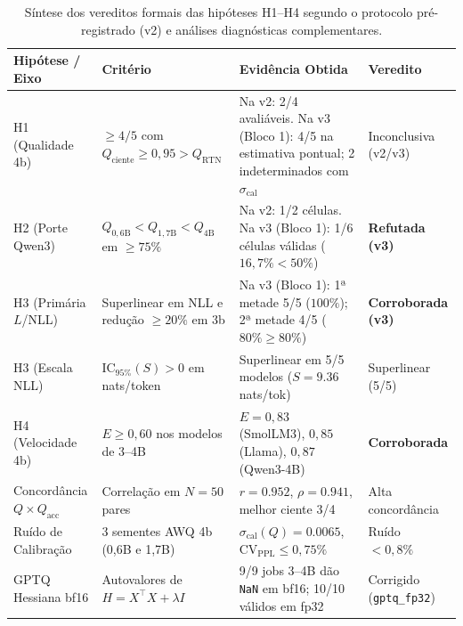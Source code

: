 \begin{table}[htbp]
\centering
\caption{Síntese dos vereditos formais das hipóteses H1--H4 segundo o protocolo pré-registrado (v2) e análises diagnósticas complementares.}
\label{tab:vereditos_hipoteses}
\footnotesize
\begin{tabular}{p{2.8cm}p{4.2cm}p{5.2cm}p{2.2cm}}
\toprule
Hipótese / Eixo & Critério & Evidência Obtida & Veredito \\
\midrule
H1 (Qualidade 4b) & $\ge 4/5$ com $Q_{\text{ciente}} \ge 0{,}95 > Q_{\text{RTN}}$ & Na v2: 2/4 avaliáveis. Na v3 (Bloco 1): 4/5 na estimativa pontual; 2 indeterminados com $\sigma_{\text{cal}}$ & Inconclusiva (v2/v3) \\
H2 (Porte Qwen3) & $Q_{0{,}6\text{B}} < Q_{1{,}7\text{B}} < Q_{4\text{B}}$ em $\ge 75\%$ & Na v2: 1/2 células. Na v3 (Bloco 1): 1/6 células válidas ($16{,}7\% < 50\%$) & \textbf{Refutada (v3)} \\
H3 (Primária $L$/NLL) & Superlinear em NLL e redução $\ge 20\%$ em 3b & Na v3 (Bloco 1): 1ª metade 5/5 ($100\%$); 2ª metade 4/5 ($80\% \ge 80\%$) & \textbf{Corroborada (v3)} \\
H3 (Escala NLL) & $\text{IC}_{95\%}(S) > 0$ em nats/token & Superlinear em 5/5 modelos ($S = 9.36$ nats/tok) & Superlinear (5/5) \\
H4 (Velocidade 4b) & $E \ge 0{,}60$ nos modelos de 3--4B & $E = 0{,}83$ (SmolLM3), $0{,}85$ (Llama), $0{,}87$ (Qwen3-4B) & \textbf{Corroborada} \\
Concordância $Q \times Q_{\text{acc}}$ & Correlação em $N=50$ pares & $r = 0.952$, $\rho = 0.941$, melhor ciente 3/4 & Alta concordância \\
Ruído de Calibração & 3 sementes AWQ 4b (0,6B e 1,7B) & $\sigma_{\text{cal}}(Q) = 0.0065$, $\text{CV}_{\text{PPL}} \le 0{,}75\%$ & Ruído $< 0{,}8\%$ \\
GPTQ Hessiana bf16 & Autovalores de $H = X^\top X + \lambda I$ & 9/9 jobs 3--4B dão \texttt{NaN} em bf16; 10/10 válidos em fp32 & Corrigido (\texttt{gptq\_fp32}) \\
\bottomrule
\end{tabular}
\end{table}
